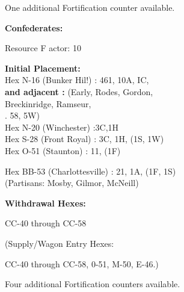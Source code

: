 \begin{scenariodata}
One additional Fortification counter available.\\
\end{scenariodata}

\begin{scenariodata}
\textbf{Confederates:}\\
\end{scenariodata}

Resource F actor: 10

\begin{scenariodata}
\textbf{Initial Placement:}\\
Hex N-16 (Bunker Hil!) : 461, 10A, IC,\\
\textbf{and adjacent :} (Early, Rodes, Gordon,\\
Breckinridge, Ramseur,\\
. 58, 5W)\\
Hex N-20 (Winchester) :3C,1H\\
Hex S-28 (Front Royal) : 3C, 1H, (1S, 1W)\\
Hex O-51 (Staunton) : 11, (1F)\\
\end{scenariodata}

\begin{scenariodata}
Hex BB-53 (Charlottesville) : 21, 1A, (1F, 1S)\\
(Partisans: Mosby, Gilmor, McNeill)\\
\end{scenariodata}

\begin{scenariodata}
\textbf{Withdrawal Hexes:}\\
\end{scenariodata}

\begin{scenariodata}
CC-40 through CC-58\\
\end{scenariodata}

\begin{scenariodata}
(Supply/Wagon Entry Hexes:\\
\end{scenariodata}

\begin{scenariodata}
CC-40 through CC-58, 0-51, M-50, E-46.)\\
\end{scenariodata}

\begin{scenariodata}
Four additional Fortification counters available.\\
\end{scenariodata}

